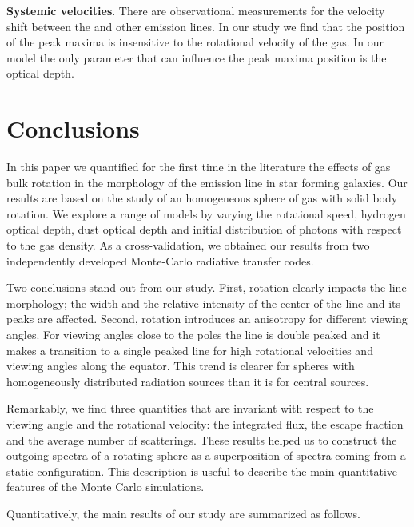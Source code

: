 \documentclass{emulateapj}
\newcommand{\ly}{{\ifmmode{{\rm Ly}\alpha~}\else{Ly$\alpha$~}\fi}}
\begin{document}
{\bf Systemic velocities}. There are observational measurements for the
velocity shift between the \ly and other emission lines. In our study
we find that the position of the peak maxima is insensitive to the
rotational velocity of the gas. In our model the only parameter that
can influence the peak maxima position is the optical depth.

\section{Conclusions}
\label{sec:conclusions}

In this paper we quantified for the first time in the literature the effects
of gas bulk rotation in the morphology of the \ly emission line in
star forming galaxies.   
Our results are based on the study of an homogeneous sphere
of gas with solid body rotation. 
We explore a range of models by varying the rotational speed, hydrogen
optical depth, dust optical depth and initial distribution of \ly
photons with respect to the gas density. 
As a cross-validation, we obtained our results from two independently
developed Monte-Carlo radiative transfer codes.  

Two conclusions stand out from our study. 
First, rotation clearly impacts the \ly line morphology; the width and
the relative intensity of the center of the line and its peaks are
affected. 
Second, rotation introduces an anisotropy for different viewing
angles. 
For viewing angles close to the poles the line is double peaked and it
makes a transition to a single peaked line for high rotational
velocities and viewing angles along the equator. 
This trend is clearer for spheres with homogeneously distributed
radiation sources than it is for central sources.

Remarkably, we find three quantities that are invariant with respect
to the viewing angle and the rotational velocity: the integrated flux,
the escape fraction and the average number of scatterings.
These results helped us to construct the outgoing spectra of a
rotating sphere as a superposition of spectra coming from a static
configuration. This description is useful to describe the main
quantitative features of the Monte Carlo simulations. 


Quantitatively, the main results of our study are summarized as
follows. 
\end{document}
